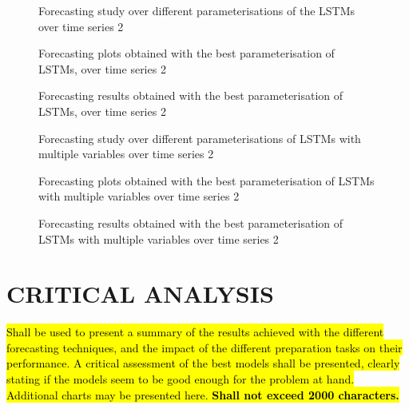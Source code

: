 \documentclass[10pt]{extarticle}
\newcommand{\ctext}[3][RGB]{%
  \begingroup
  \definecolor{hlcolor}{#1}{#2}\sethlcolor{hlcolor}%
  \hl{#3}%
  \endgroup
}
\begin{document}
\begin{figure}[H]
\caption{Forecasting study over different parameterisations of the LSTMs over time series 2}
\end{figure}

\begin{figure}[H]
\caption{Forecasting plots obtained with the best parameterisation of LSTMs, over time series 2}
\end{figure}

\begin{figure}[H]
\caption{Forecasting results obtained with the best parameterisation of LSTMs, over time series 2}
\end{figure}

\begin{figure}[H]
\caption{Forecasting study over different parameterisations of LSTMs with multiple variables over time series 2}
\end{figure}

\begin{figure}[H]
\caption{Forecasting plots obtained with the best parameterisation of LSTMs with multiple variables over time series 2}
\end{figure}

\begin{figure}[H]
\caption{Forecasting results obtained with the best parameterisation of LSTMs with multiple variables over time series 2}
\end{figure}

\section{CRITICAL ANALYSIS}
\ctext[RGB]{190,190,190}{Shall be used to present a summary of the results achieved with the different forecasting techniques, and the impact of the different preparation tasks on their performance. A critical assessment of the best models shall be presented, clearly stating if the models seem to be good enough for the problem at hand. Additional charts may be presented here.  \textbf{Shall not exceed 2000 characters.}}
\end{document}
